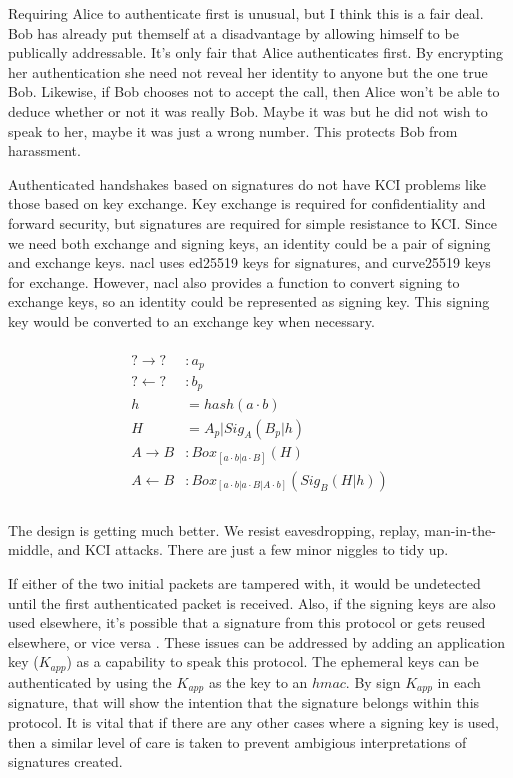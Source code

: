 \documentclass[12pt]{article}
\begin{document}
Requiring Alice to authenticate first is unusual, but
I think this is a fair deal. Bob has already put themself
at a disadvantage by allowing himself to be publically
addressable. It's only fair that Alice authenticates first.
By encrypting her authentication she need not reveal her
identity to anyone but the one true Bob. Likewise, if Bob chooses
not to accept the call, then Alice won't be able to deduce
whether or not it was really Bob. Maybe it was but he did not wish
to speak to her, maybe it was just a wrong number. This protects
Bob from harassment.

Authenticated handshakes based on signatures do not have KCI problems
like those based on key exchange. Key exchange is required for
confidentiality and forward security, but signatures are required
for simple resistance to KCI.
Since we need both exchange and signing keys,
an identity could be a pair of signing and exchange keys.
nacl uses ed25519 keys for signatures, and
curve25519 keys for exchange. However, 
nacl also provides a function to convert signing to exchange keys,
so an identity could be represented as signing key.
This signing key would be converted to an exchange key when necessary.

$$
\begin{align*}
\\
    ? \to ? &: a_p   \\
    ? \gets ? &: b_p \\
    h &= hash(a \cdot b) \\
    H &= A_{p}|Sig_A(B_p|h) \\
    A \to B &: Box_{[a \cdot b | a \cdot B]}(H)\\
    A \gets B &: Box_{[a \cdot b | a \cdot B | A \cdot b]}(Sig_B(H|h) )\\
\\
\end{align*}
$$

The design is getting much better. We resist eavesdropping, replay,
man-in-the-middle, and KCI attacks. There are just a few minor
niggles to tidy up.

If either of the two initial packets are tampered with, it would
be undetected until the first authenticated packet is received.
Also, if the signing keys are also used elsewhere, it's possible
that a signature from this protocol or gets reused elsewhere,
or vice versa \cite{cpa}. These issues can be addressed by
adding an application key ($K_{app}$) as a capability to speak
this protocol. The ephemeral keys can be authenticated by using
the $K_{app}$ as the key to an $hmac$. By sign $K_{app}$ in each signature,
that will show the intention that the signature belongs within this
protocol. It is vital that if there are any other cases where a signing
key is used, then a similar level of care is taken to prevent ambigious
interpretations of signatures created.
\end{document}

